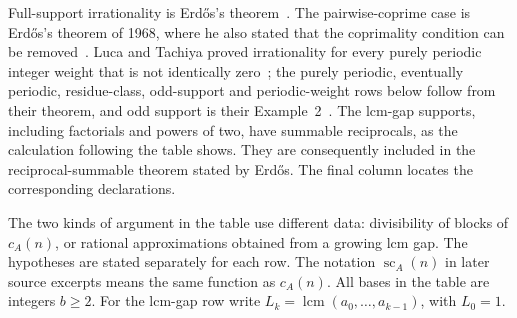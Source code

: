 \documentclass[11pt]{article}
\theoremstyle{plain}
\theoremstyle{definition}
\theoremstyle{remark}
\begin{document}
Full-support irrationality is Erd\H{o}s's theorem~\cite{erdos1948}.  The
pairwise-coprime case is Erd\H{o}s's theorem of 1968, where he also stated that
the coprimality condition can be removed~\cite[p.~222]{erdos1968}.  Luca and
Tachiya proved irrationality for every purely periodic integer weight that is
not identically zero~\cite[Theorem~A, p.~139]{lucatachiya2017}; the purely
periodic, eventually periodic, residue-class, odd-support and periodic-weight
rows below follow from their theorem, and odd support is their
Example~2~\cite[p.~140]{lucatachiya2017}.  The lcm-gap supports, including factorials and powers of two, have
summable reciprocals, as the calculation following the table shows.
They are consequently included in the reciprocal-summable theorem
stated by Erd\H{o}s. The final column locates the corresponding
declarations.

The two kinds of argument in the table use different data: divisibility
of blocks of $c_A(n)$, or rational approximations obtained from a growing
lcm gap. The hypotheses are stated separately for each row. The notation
$\operatorname{sc}_A(n)$ in later source excerpts means the same
function as $c_A(n)$.  All bases in the table are integers $b\ge2$.
For the lcm-gap row write
$L_k=\operatorname{lcm}(a_0,\ldots,a_{k-1})$, with $L_0=1$.
\end{document}
